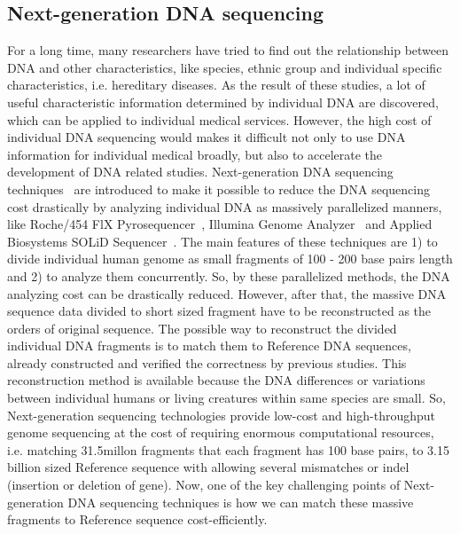 \subsection{Next-generation DNA sequencing} For a long time, many researchers
have tried to find out the relationship between DNA and other characteristics,
like species, ethnic group and individual specific characteristics, i.e.
hereditary diseases.  As the result of these studies, a lot of useful
characteristic information determined by individual DNA are discovered, which
can be applied to individual medical services. However, the high cost of
individual DNA sequencing would makes it difficult not only to use DNA
information for individual medical broadly, but also to accelerate the
development of DNA related studies.  Next-generation DNA sequencing
techniques~\cite{genome_sequence_0, genome_sequence_1, genome_sequence_2,
genome_sequence_3, genome_sequence_4} are introduced to make it possible to
reduce the DNA sequencing cost drastically by analyzing individual DNA as
massively parallelized manners, like Roche/454 FlX
Pyrosequencer~\cite{roche454}, Illumina Genome Analyzer~\cite{illumina} and
Applied Biosystems SOLiD Sequencer~\cite{solid}. The main features of these
techniques are 1) to divide individual human genome as small fragments of 100 -
200 base pairs length and 2) to analyze them concurrently. So, by these
parallelized methods, the DNA analyzing cost can be drastically reduced.
However, after that, the massive DNA sequence data divided to short sized
fragment have to be reconstructed as the orders of original sequence. The
possible way to reconstruct the divided individual DNA fragments is to match
them to Reference DNA sequences, already constructed and verified the
correctness by previous studies. This reconstruction method is available
because the DNA differences or variations between individual humans or living
creatures within same species are small.  So, Next-generation sequencing
technologies provide low-cost and high-throughput genome sequencing at the cost
of requiring enormous computational resources, i.e. matching 31.5millon
fragments that each fragment has 100 base pairs, to 3.15 billion sized
Reference sequence with allowing several mismatches or indel (insertion or
deletion of gene). Now, one of the key challenging points of Next-generation
DNA sequencing techniques is how we can match these massive fragments to
Reference sequence cost-efficiently. \\

